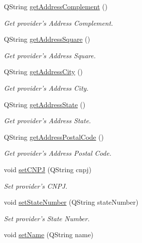 \begin{DoxyCompactItemize}
\-Q\-String \hyperlink{class_provider_a06f80420be4bb320edc787713b338266}{get\-Address\-Complement} ()
\begin{DoxyCompactList}\small\item\em \-Get provider's \-Address \-Complement. \end{DoxyCompactList}\item 
\-Q\-String \hyperlink{class_provider_a5e712477be60774345c780ef85162abb}{get\-Address\-Square} ()
\begin{DoxyCompactList}\small\item\em \-Get provider's \-Address \-Square. \end{DoxyCompactList}\item 
\-Q\-String \hyperlink{class_provider_aa2faeb821bbb3b04268138c64c28fd22}{get\-Address\-City} ()
\begin{DoxyCompactList}\small\item\em \-Get provider's \-Address \-City. \end{DoxyCompactList}\item 
\-Q\-String \hyperlink{class_provider_a8d00b8aa693a217197331f9366690bc8}{get\-Address\-State} ()
\begin{DoxyCompactList}\small\item\em \-Get provider's \-Address \-State. \end{DoxyCompactList}\item 
\-Q\-String \hyperlink{class_provider_a9cbfde3219a81ef056b43a4aa906b849}{get\-Address\-Postal\-Code} ()
\begin{DoxyCompactList}\small\item\em \-Get provider's \-Address \-Postal \-Code. \end{DoxyCompactList}\item 
void \hyperlink{class_provider_af0eeccdd1cf6725631e1d93f019ece94}{set\-C\-N\-P\-J} (\-Q\-String cnpj)
\begin{DoxyCompactList}\small\item\em \-Set provider's \-C\-N\-P\-J. \end{DoxyCompactList}\item 
void \hyperlink{class_provider_a01865da503225dcce0126d2f8849d091}{set\-State\-Number} (\-Q\-String state\-Number)
\begin{DoxyCompactList}\small\item\em \-Set provider's \-State \-Number. \end{DoxyCompactList}\item 
void \hyperlink{class_provider_ac5fc7466783f700eaa6875f06c66bf59}{set\-Name} (\-Q\-String name)

\end{DoxyCompactItemize}
